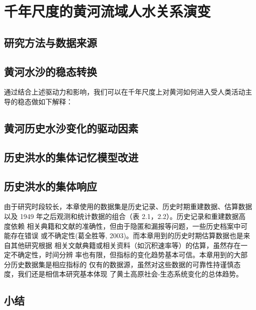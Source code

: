 \chapter{千年尺度的黄河流域人水关系演变}
\label{cha:3}


\section{研究方法与数据来源}
\label{ch3:methods}



\section{黄河水沙的稳态转换}

通过结合上述驱动力和影响，我们可以在千年尺度上对黄河如何进入受人类活动主导的稳态做如下解释：

\section{黄河历史水沙变化的驱动因素}

\section{历史洪水的集体记忆模型改进}

\section{历史洪水的集体响应}

由于研究时段较长，本章使用的数据集是历史记录、历史时期重建数据、估算数据 以及 1949 年之后观测和统计数据的组合（表 2.1，2.2）。历史记录和重建数据高度依赖 相关典籍和文献的准确性，但由于隐匿和漏报等问题，一些历史档案中可能存在错误 或不确定性(葛全胜等, 2003)。而本章用到的历史时期估算数据也是来自其他研究根据 相关文献典籍或相关资料（如沉积速率等）的估算，虽然存在一定不确定性，时间分辨 率也有限，但指标的变化趋势基本可信。本章用到的大部分历史数据集是相应指标的 仅有的数据源，虽然对这些数据的可靠性持谨慎态度，我们还是相信本研究基本体现 了黄土高原社会-生态系统变化的总体趋势。

\section{小结}